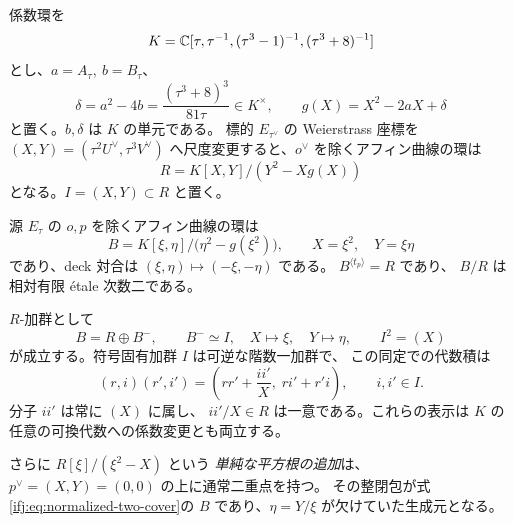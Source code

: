 \begin{proposition}[相対二重被覆の有限代数と符号固有加群]
\label{ifj:prop:double-cover-algebra}
係数環を
\[
 K=\mathbb C[\tau,\tau^{-1},(\tau^3-1)^{-1},(\tau^3+8)^{-1}]
\]
とし、$a=A_\tau,\ b=B_\tau$、
\[
 \delta=a^2-4b=\frac{(\tau^3+8)^3}{81\tau}\in K^\times,
 \qquad
 g(X)=X^2-2aX+\delta
\]
と置く。$b,\delta$ は $K$ の単元である。
標的 $E_{\tau^\vee}$ の
Weierstrass 座標を $(X,Y)=(\tau^2U^\vee,\tau^3V^\vee)$
へ尺度変更すると、$o^\vee$ を除くアフィン曲線の環は
\[
 R=K[X,Y]/(Y^2-Xg(X))
\]
となる。$I=(X,Y)\subset R$ と置く。

源 $E_\tau$ の $o,p$ を除くアフィン曲線の環は
\begin{equation}\label{ifj:eq:normalized-two-cover}
 B=K[\xi,\eta]/\bigl(\eta^2-g(\xi^2)\bigr),\qquad
 X=\xi^2,\quad Y=\xi\eta
\end{equation}
であり、deck 対合は
$(\xi,\eta)\mapsto(-\xi,-\eta)$ である。
$B^{\langle t_p\rangle}=R$ であり、
$B/R$ は相対有限 \'{e}tale 次数二である。

$R$-加群として
\begin{equation}\label{ifj:eq:double-cover-ideal-algebra}
 B=R\oplus B^{-},\qquad
 B^{-}\simeq I,\quad
 X\longmapsto\xi,\quad Y\longmapsto\eta,\qquad
 I^2=(X)
\end{equation}
が成立する。符号固有加群 $I$ は可逆な階数一加群で、
この同定での代数積は
\[
 (r,i)(r',i')
  =\left(rr'+\frac{ii'}{X},\;ri'+r'i\right),
 \qquad i,i'\in I .
\]
分子 $ii'$ は常に $(X)$ に属し、
$ii'/X\in R$ は一意である。これらの表示は
$K$ の任意の可換代数への係数変更とも両立する。

さらに $R[\xi]/(\xi^2-X)$ という
\emph{単純な平方根の追加}は、$p^\vee=(X,Y)=(0,0)$
の上に通常二重点を持つ。
その整閉包が式\eqref{ifj:eq:normalized-two-cover}の $B$
であり、$\eta=Y/\xi$ が欠けていた生成元となる。
\end{proposition}

